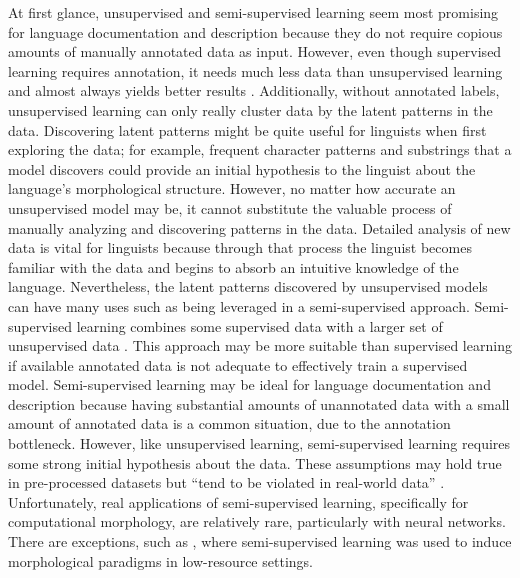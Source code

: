 At first glance, unsupervised and semi-supervised learning seem most promising for language documentation and description because they do not require copious amounts of manually annotated data as input. However, even though supervised learning requires annotation, it needs much less data than unsupervised learning and almost always yields better results \citep{ruokolainen_supervised_2013,cotterell_labeled_2015}. Additionally, without annotated labels, unsupervised learning can only really cluster data by the latent patterns in the data. Discovering latent patterns might be quite useful for linguists when first exploring the data; for example, frequent character patterns and substrings that a model discovers could provide an initial hypothesis to the linguist about the language's morphological structure. However, no matter how accurate an unsupervised model may be, it cannot substitute the valuable process of manually analyzing and discovering patterns in the data. Detailed analysis of new data is vital for linguists because through that process the linguist becomes familiar with the data and begins to absorb an intuitive knowledge of the language. Nevertheless, the latent patterns discovered by unsupervised models can have many uses such as being leveraged in a semi-supervised approach. Semi-supervised learning combines some supervised data with a larger set of unsupervised data   \citep{kohonen_semi-supervised_2010,poon_unsupervised_2009}. This approach may be more suitable than supervised learning if available annotated data is not adequate to effectively train a supervised model. 
Semi-supervised learning may be ideal for language documentation and description because having substantial amounts of unannotated data with a small amount of annotated data is a common situation, due to the annotation bottleneck. However, like unsupervised learning, semi-supervised learning requires some strong initial hypothesis about the data. These assumptions may hold true in pre-processed datasets but ``tend to be violated in real-world data'' \citep{druck_reducing_2007}. Unfortunately, real applications of semi-supervised learning, specifically for computational morphology, are relatively rare, particularly with neural networks. There are exceptions, such as \citet{ahlberg_semi-supervised_2014}, where semi-supervised learning was used to induce morphological paradigms in low-resource settings. 

